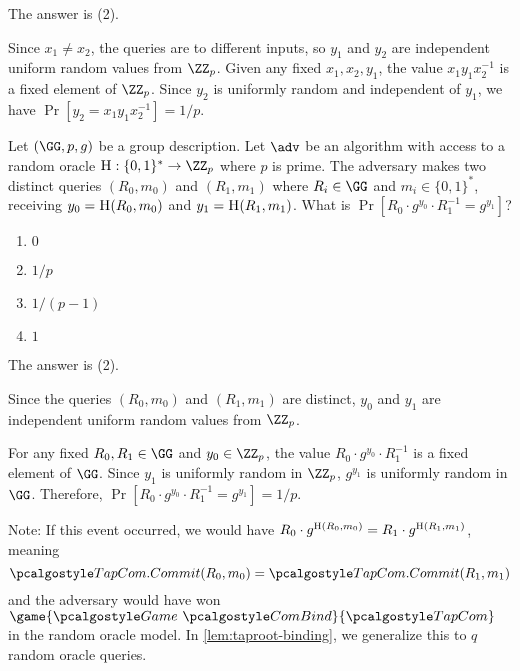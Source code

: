 \ifsolutions
\begin{mysolution}
  The answer is (2).
  
  Since $x_1 \neq x_2$, the queries are to different inputs, so $y_1$ and $y_2$ are independent uniform random values from $\ZZ_p$. 
  Given any fixed $x_1, x_2, y_1$, the value $x_1 y_1 x_2^{-1}$ is a fixed element of $\ZZ_p$.
  Since $y_2$ is uniformly random and independent of $y_1$, we have $\Pr[y_2 = x_1 y_1 x_2^{-1}] = 1/p$.
\end{mysolution}
\fi

\begin{exercise}
  Let $\gparam$ be a group description.
  Let $\adv$ be an algorithm with access to a random oracle $\pcoracle{H}: \{0,1\}^* \to \ZZ_p$ where $p$ is prime.
  The adversary makes two distinct queries $(R_0, m_0)$ and $(R_1, m_1)$ where $R_i \in \GG$ and $m_i \in \{0,1\}^*$, receiving $y_0 = {\normalfont\textsc{H}}(R_0, m_0)$ and $y_1 = {\normalfont\textsc{H}}(R_1, m_1)$.
  What is $\Pr[R_0 \cdot g^{y_0} \cdot R_1^{-1} = g^{y_1}]$?
  \begin{enumerate}
    \item $0$
    \item $1/p$
    \item $1/(p-1)$
    \item $1$
  \end{enumerate}
\end{exercise}

\ifsolutions
\begin{mysolution}
  The answer is (2).
  
  Since the queries $(R_0, m_0)$ and $(R_1, m_1)$ are distinct, $y_0$ and $y_1$ are independent uniform random values from $\ZZ_p$.
  
  For any fixed $R_0, R_1 \in \GG$ and $y_0 \in \ZZ_p$, the value $R_0 \cdot g^{y_0} \cdot R_1^{-1}$ is a fixed element of $\GG$.
  Since $y_1$ is uniformly random in $\ZZ_p$, $g^{y_1}$ is uniformly random in $\GG$.
  Therefore, $\Pr[R_0 \cdot g^{y_0} \cdot R_1^{-1} = g^{y_1}] = 1/p$.
  
  Note: If this event occurred, we would have $R_0 \cdot g^{{\normalfont\textsc{H}}(R_0, m_0)} = R_1 \cdot g^{{\normalfont\textsc{H}}(R_1, m_1)}$, meaning
  \[
    \algo{TapCom.Commit}(R_0, m_0) = \algo{TapCom.Commit}(R_1, m_1)
  \] and the adversary would have won $\game{\Game~\algo{ComBind}}{\algo{TapCom}}$ in the random oracle model.
  In \autoref{lem:taproot-binding}, we generalize this to $q$ random oracle queries.
\end{mysolution}
\fi

